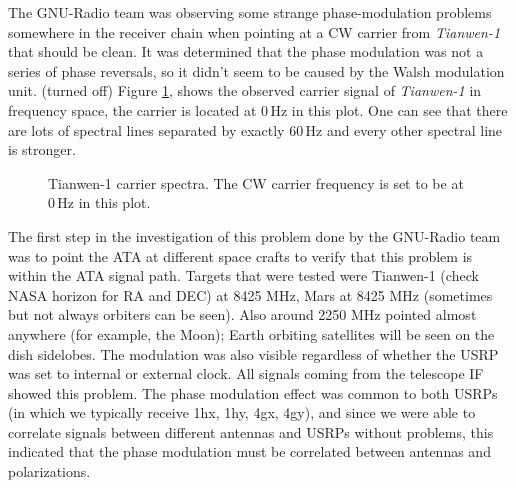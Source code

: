\documentclass[12pt]{article}
\begin{document}
The GNU-Radio team was observing some strange phase-modulation problems somewhere in the receiver chain when pointing at a CW carrier from \textit{Tianwen-1} that should be clean. It was determined that the phase modulation was not a series of phase reversals, so it didn't seem to be caused by the Walsh modulation unit. (turned off)
Figure \ref{fig:Tianwen-1}, shows the observed carrier signal of \textit{Tianwen-1} in frequency space, the carrier is located at 0\,Hz in this plot. One can see that there are lots of spectral lines separated by exactly 60\,Hz and every other spectral line is stronger.

%
\begin{figure}[h]
\caption{Tianwen-1 carrier spectra. The CW carrier frequency is set to be at 0\,Hz in this plot.}
\label{fig:Tianwen-1}
\end{figure}
%

The first step in the investigation of this problem done by the GNU-Radio team was to point the ATA at different space crafts to verify that this problem is within the ATA signal path. Targets that were tested were Tianwen-1 (check NASA horizon for RA and DEC) at 8425 MHz, Mars at 8425 MHz (sometimes but not always orbiters can be seen). Also around 2250 MHz pointed almost anywhere (for example, the Moon); Earth orbiting satellites will be seen on the dish sidelobes. The modulation was also visible regardless of whether the USRP was set to internal or external clock. All signals coming from the telescope IF showed this problem. The phase modulation effect was common to both USRPs (in which we typically receive 1hx, 1hy, 4gx, 4gy), and since we were able to correlate signals between different antennas and USRPs without problems, this indicated that the phase modulation must be correlated between antennas and polarizations.
\end{document}
